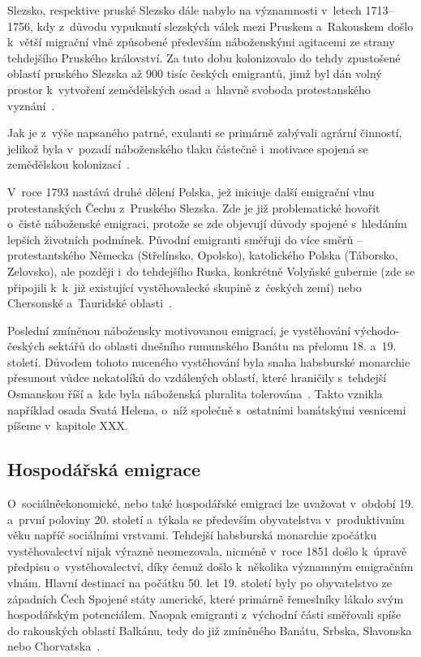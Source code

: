 Slezsko, respektive pruské Slezsko dále nabylo na významnosti v~letech 1713--1756, kdy z~důvodu vypuknutí slezských válek mezi Pruskem a~Rakouskem došlo k~větší migrační vlně způsobené především náboženskými agitacemi ze strany tehdejšího Pruského království. Za tuto dobu kolonizovalo do tehdy zpustošené oblastí pruského Slezska až 900 tisíc českých emigrantů, jimž byl dán volný prostor k~vytvoření zemědělských osad a~hlavně svoboda protestanského vyznání~\parencite{Vaculik2002}.

Jak je z~výše napsaného patrné, exulanti se primárně zabývali agrární činností, jelikož byla v~pozadí náboženského tlaku částečně i~motivace spojená se zemědělskou kolonizací~\parencite{Broucek2017}.

V~roce 1793 nastává druhé dělení Polska, jež iniciuje další emigrační vlnu protestanských Čechu z~Pruského Slezska. Zde je již problematické hovořit o~čistě náboženské emigraci, protože se zde objevují důvody spojené s~hledáním lepších životních podmínek. Původní emigranti směřuji do více směrů -- protestantského Německa (Střelínsko, Opolsko), katolického Polska (Táborsko, Zelovsko), ale později i~do tehdejšího Ruska, konkrétně Volyňské gubernie (zde se připojili k~k~již existující vystěhovalecké skupině z~českých zemí) nebo Chersonské a~Tauridské oblasti~\parencite{Vaculik2009a}.

Poslední zmíněnou nábožensky motivovanou emigrací, je vystěhování východo-českých sektářů do oblasti dnešního rumunského Banátu na přelomu 18. a~19. století. Důvodem tohoto nuceného vystěhování byla snaha habsburské monarchie přesunout vůdce nekatolíků do vzdálených oblastí, které hraničily s~tehdejší Osmanskou říší a~kde byla náboženská pluralita tolerována~\parencite{Nespor2005}. Takto vznikla například osada Svatá Helena, o~níž společně s~ostatními banátskými vesnicemi píšeme v~kapitole XXX.

\hypertarget{hospoduxe1ux159skuxe1-emigrace}{%
\subsection{Hospodářská emigrace}\label{hospoduxe1ux159skuxe1-emigrace}}

O~sociálněekonomické, nebo také hospodářské emigraci lze uvažovat v~období 19. a~první poloviny 20. století a~týkala se především obyvatelstva v~produktivním věku napříč sociálními vrstvami. Tehdejší habsburská monarchie zpočátku vystěhovalectví nijak výrazně neomezovala, nicméně v~roce 1851 došlo k~úpravě předpisu o~vystěhovalectví, díky čemuž došlo k~několika významným emigračním vlnám. Hlavní destinací na počátku 50. let 19. století byly po obyvatelstvo ze západních Čech Spojené státy americké, které primárně řemeslníky lákalo svým hospodářským potenciálem. Naopak emigranti z~východní části směřovali spíše do rakouských oblastí Balkánu, tedy do již zmíněného Banátu, Srbska, Slavonska nebo Chorvatska~\parencite{Vaculik2009b}.

